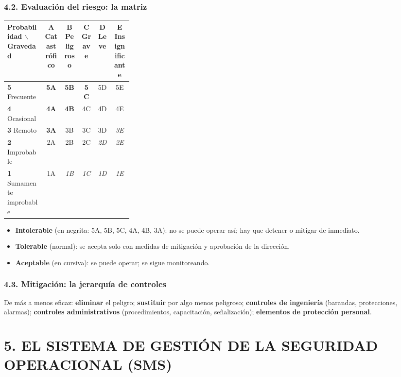 \subsubsection*{4.2. Evaluación del riesgo: la matriz}
\begin{center}
\small
\begin{tabular}{|p{0.30\linewidth}|c|c|c|c|c|}
\hline
\textbf{Probabilidad} $\backslash$ \textbf{Gravedad} & \textbf{A} Catastrófico & \textbf{B}
Peligroso & \textbf{C} Grave & \textbf{D} Leve & \textbf{E} Insignificante \\ \hline
\textbf{5} Frecuente & \textbf{5A} & \textbf{5B} & \textbf{5C} & 5D & 5E \\ \hline
\textbf{4} Ocasional & \textbf{4A} & \textbf{4B} & 4C & 4D & 4E \\ \hline
\textbf{3} Remoto & \textbf{3A} & 3B & 3C & 3D & \textit{3E} \\ \hline
\textbf{2} Improbable & 2A & 2B & 2C & \textit{2D} & \textit{2E} \\ \hline
\textbf{1} Sumamente improbable & 1A & \textit{1B} & \textit{1C} & \textit{1D} & \textit{1E} \\
\hline
\end{tabular}
\end{center}
\begin{itemize}
  \item \textbf{Intolerable} (en negrita: 5A, 5B, 5C, 4A, 4B, 3A): no se puede operar así; hay que
        detener o mitigar de inmediato.
  \item \textbf{Tolerable} (normal): se acepta solo con medidas de mitigación y aprobación de la
        dirección.
  \item \textbf{Aceptable} (en cursiva): se puede operar; se sigue monitoreando.
\end{itemize}

\subsubsection*{4.3. Mitigación: la jerarquía de controles}
De más a menos eficaz: \textbf{eliminar} el peligro; \textbf{sustituir} por algo menos
peligroso; \textbf{controles de ingeniería} (barandas, protecciones, alarmas); \textbf{controles
administrativos} (procedimientos, capacitación, señalización); \textbf{elementos de protección
personal}.

\section*{5. EL SISTEMA DE GESTIÓN DE LA SEGURIDAD OPERACIONAL (SMS)}

